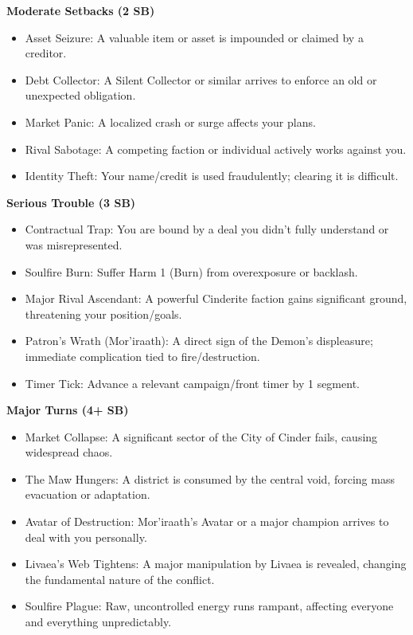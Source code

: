 \documentclass[11pt,letterpaper]{article}
\begin{document}
\textbf{Moderate Setbacks (2 SB)}
\begin{itemize}[leftmargin=*]
    \item Asset Seizure: A valuable item or asset is impounded or claimed by a creditor.
    \item Debt Collector: A Silent Collector or similar arrives to enforce an old or unexpected obligation.
    \item Market Panic: A localized crash or surge affects your plans.
    \item Rival Sabotage: A competing faction or individual actively works against you.
    \item Identity Theft: Your name/credit is used fraudulently; clearing it is difficult.
\end{itemize}

\textbf{Serious Trouble (3 SB)}
\begin{itemize}[leftmargin=*]
    \item Contractual Trap: You are bound by a deal you didn't fully understand or was misrepresented.
    \item Soulfire Burn: Suffer Harm 1 (Burn) from overexposure or backlash.
    \item Major Rival Ascendant: A powerful Cinderite faction gains significant ground, threatening your position/goals.
    \item Patron's Wrath (Mor'iraath): A direct sign of the Demon's displeasure; immediate complication tied to fire/destruction.
    \item Timer Tick: Advance a relevant campaign/front timer by 1 segment.
\end{itemize}

\textbf{Major Turns (4+ SB)}
\begin{itemize}[leftmargin=*]
    \item Market Collapse: A significant sector of the City of Cinder fails, causing widespread chaos.
    \item The Maw Hungers: A district is consumed by the central void, forcing mass evacuation or adaptation.
    \item Avatar of Destruction: Mor'iraath's Avatar or a major champion arrives to deal with you personally.
    \item Livaea's Web Tightens: A major manipulation by Livaea is revealed, changing the fundamental nature of the conflict.
    \item Soulfire Plague: Raw, uncontrolled energy runs rampant, affecting everyone and everything unpredictably.
\end{itemize}
\end{document}
